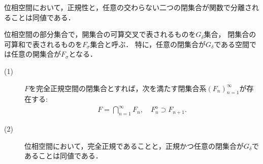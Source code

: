 	\begin{screen}
		\begin{thm}
		\label{thm:Urysohn_lemma}
			位相空間において，正規性と，任意の交わらない二つの閉集合が関数で分離されることは同値である．
		\end{thm}
	\end{screen}
	
	\begin{screen}
		\begin{dfn}
			位相空間の部分集合で，開集合の可算交叉で表されるものを$G_\delta$集合，
			閉集合の可算和で表されるものを$F_\sigma$集合と呼ぶ．
			特に，任意の閉集合が$G_\delta$である空間では任意の開集合が$F_\sigma$となる．
		\end{dfn}
	\end{screen}
	
	\begin{screen}
		\begin{thm}
		\label{thm:perfectly_normal_Hausdorff_is_normal_and_closed_is_G_delta}\mbox{}
			\begin{description}
				\item[(1)]
					$F$を完全正規空間の閉集合とすれば，次を満たす閉集合系$(F_n)_{n=1}^\infty$が存在する:
					\begin{align}
						F = \bigcap_{n=1}^\infty F_n,
						\quad F_n^{\mathrm{o}} \supset F_{n+1}. 
					\end{align}
					
				\item[(2)]
					位相空間において，完全正規であることと，正規かつ任意の閉集合が$G_\delta$であることは同値である．
			\end{description}
		\end{thm}
	\end{screen}
	

